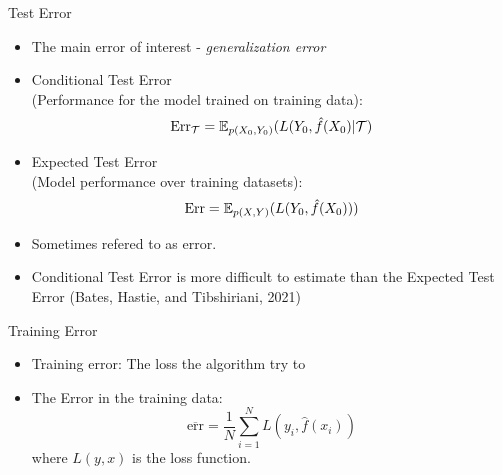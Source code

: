 \documentclass[10pt]{beamer}
\begin{document}
\begin{frame}{Test Error}

\begin{itemize}
\item The main error of interest - \emph{generalization error}
\item Conditional Test Error \\(Performance for the model trained on  training data):
\[
\text{Err}_\mathcal{T} = \operatorname{\mathbb{E}}_{p(X_0,Y_0)}(L(Y_0,\hat{f}(X_0) | \mathcal{T})
\]
\item Expected Test Error \\(Model performance over  training datasets):
\[
\text{Err} = \operatorname{\mathbb{E}}_{p(X,Y)}(L(Y_0,\hat{f}(X_0)))
\]
\item Sometimes refered to as  error.
\item Conditional Test Error is more difficult to estimate than the Expected Test Error (Bates, Hastie, and Tibshiriani, 2021)
\end{itemize}

\end{frame}


\begin{frame}{Training Error}

\begin{itemize}
\item Training error: The loss the algorithm try to 
\item The Error in the training data:
\[
\overline{\text{err}} = \frac{1}{N} \sum_{i=1}^N L(y_i,\hat{f}(x_i))
\]
where $L(y,x)$ is the loss function.

\end{itemize}

\end{frame}
\end{document}

